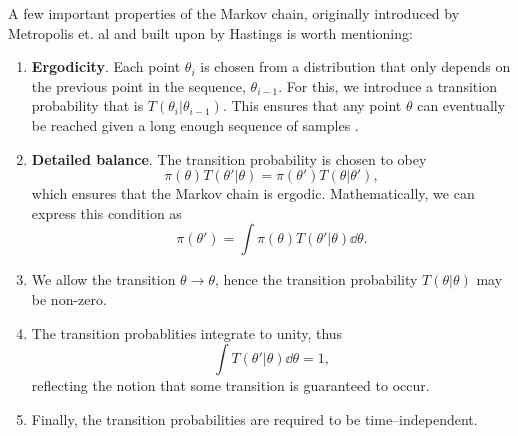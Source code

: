 A few important properties of the Markov chain, originally introduced by Metropolis et. al and built upon by Hastings \cite{metropolis}
is worth mentioning:
\begin{enumerate}
  \item \textbf{Ergodicity}. Each point $\theta_i$ is chosen from a distribution that only depends on the previous point in the sequence, $\theta_{i-1}$. For this, we introduce a transition probability that is  $T(\theta_i|\theta_{i-1})$. This ensures that any point $\theta$ can eventually be reached given a long enough sequence of samples \cite{numerical_recipies}. 
  \item \textbf{Detailed balance}. The transition probability is chosen to obey $$\pi(\theta)T(\theta'|\theta) = \pi(\theta')T(\theta|\theta'),$$ which ensures that the Markov chain is ergodic. Mathematically, we can express this condition as
  $$\pi(\theta') = \int \pi(\theta)T(\theta'|\theta)\dd\theta.$$
  \item We allow the transition $\theta \to \theta$, hence the transition probability $T(\theta|\theta)$ may be non-zero.
  \item The transition probablities integrate to unity, thus $$\int T(\theta'|\theta)\dd\theta = 1,$$
  reflecting the notion that some transition is guaranteed to occur.
  \item Finally, the transition probabilities are required to be time--independent.
\end{enumerate}


